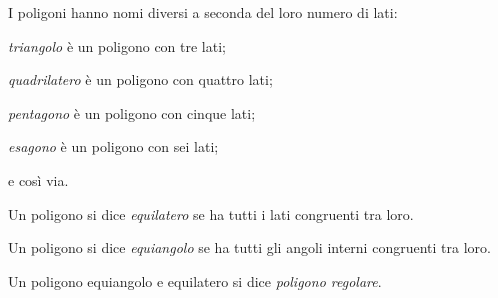 \begin{inaccessibleblock}
\begin{center}\end{center}
\end{inaccessibleblock}

I poligoni hanno nomi diversi a seconda del loro numero di lati:
\begin{itemize*}
\item \emph{triangolo} è un poligono con tre lati;
\item \emph{quadrilatero} è un poligono con quattro lati;
\item \emph{pentagono} è un poligono con cinque lati;
\item \emph{esagono} è un poligono con sei lati;
\item e così via.
\end{itemize*}

\begin{definizione}
Un poligono si dice \emph{equilatero} se ha tutti i lati congruenti 
tra loro.
\end{definizione}

\begin{definizione}
Un poligono si dice \emph{equiangolo} se ha tutti gli angoli interni 
congruenti tra loro.
\end{definizione}

\begin{definizione}
Un poligono equiangolo e equilatero si dice \emph{poligono regolare}.
\end{definizione}





